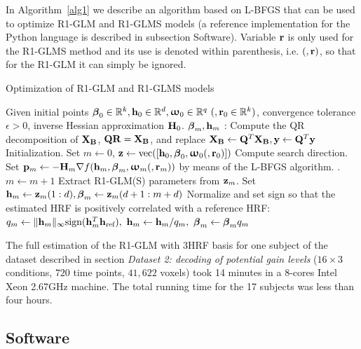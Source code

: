 In Algorithm~\ref{alg1} we describe an algorithm based on L-BFGS that can be used to optimize R1-GLM and R1-GLMS models (a reference implementation for the Python language is described in subsection Software). Variable $\mathbf{r}$ is only used for the R1-GLMS method and its use is denoted within parenthesis, i.e. $(, \mathbf{r})$, so that for the R1-GLM it can simply be ignored.
%
\begin{algorithm}
\caption{Optimization of R1-GLM and R1-GLMS models}
\label{alg1}
\begin{algorithmic}[1]
\REQUIRE Given initial points ${\boldsymbol \beta}_0 \in {\mathbb R}^k, \mathbf{h}_0 \in {\mathbb R}^d, {{\boldsymbol \upomega}}_0 \in {\mathbb R}^q ~(, \mathbf{r}_0 \in {\mathbb R}^k)$, convergence tolerance $\epsilon > 0$, inverse Hessian approximation $\mathbf{H}_0$. 
\ENSURE ${\boldsymbol \beta}_m, \mathbf{h}_m$
: Compute the QR decomposition of $\mathbf{X}_{\mathbf{B}}$, $\mathbf{Q} \mathbf{R} = \mathbf{X}_{\mathbf{B}}$, and replace $\mathbf{X}_{\mathbf{B}} \leftarrow \mathbf{Q}^T \mathbf{X}_{\mathbf{B}}, \mathbf{y} \leftarrow \mathbf{Q}^T \mathbf{y}$
\STATE Initialization. Set $m \leftarrow 0$, $\mathbf{z} \leftarrow \operatorname*{vec}([\mathbf{h}_0, {\boldsymbol \beta}_0, {\boldsymbol \upomega}_0 (, \mathbf{r}_0)])$
\STATE Compute search direction.  Set $\mathbf{p}_m \leftarrow - \mathbf{H}_m \nabla f(\mathbf{h}_m, {\boldsymbol \beta}_m, {\boldsymbol \upomega}_m (, \mathbf{r}_m))$
by means of the L-BFGS algorithm.
.
\STATE $m \leftarrow m+1$
\ENDWHILE 
\STATE Extract R1-GLM(S) parameters from $\mathbf{z}_m$. Set $\mathbf{h}_m \leftarrow \mathbf{z}_m(1:d), {\boldsymbol \beta}_m \leftarrow \mathbf{z}_m(d+1:m+d)$
\STATE Normalize and set sign so that the estimated HRF is positively correlated with a reference HRF: $q_m \leftarrow \|\mathbf{h}_m\|_{\infty} \text{sign}(\mathbf{h}_m^T \mathbf{h}_{\text{ref}}),~ \mathbf{h}_m \leftarrow \mathbf{h}_m / q_m, ~{\boldsymbol \beta}_m \leftarrow {\boldsymbol \beta}_m q_m$
\end{algorithmic} 
\end{algorithm}

The full estimation of the R1-GLM with 3HRF basis for one subject of the
dataset described in section {\it Dataset 2: decoding of potential gain
levels} ($16 \times 3$ conditions, $720$ time points, $41,622$ voxels) took 14
minutes in a 8-cores Intel Xeon 2.67GHz machine. The total running time for
the 17 subjects was less than four hours.


\subsection{Software}

